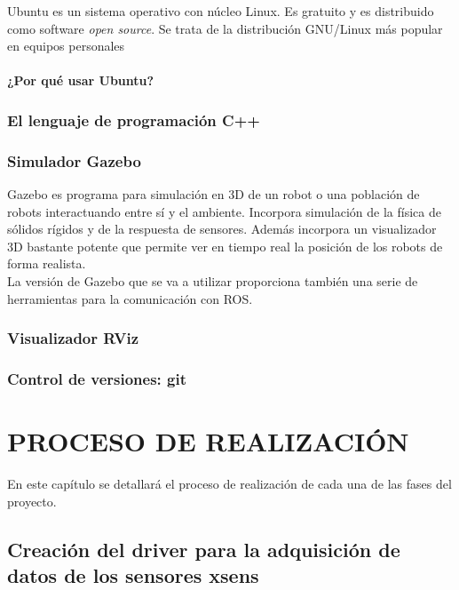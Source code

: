 \documentclass[10pt, a4paper]{report}
\begin{document}
Ubuntu es un sistema operativo con núcleo Linux. Es gratuito y es distribuido como software \textit{open source}. Se trata de la distribución GNU/Linux más popular en equipos personales

\subsubsection{¿Por qué usar Ubuntu?}

\subsection{El lenguaje de programación C++}



\subsection{Simulador Gazebo}

Gazebo es programa para simulación en 3D de un robot o una población de robots interactuando entre sí y el ambiente. Incorpora simulación de la física de sólidos rígidos y de la respuesta de sensores. Además incorpora un visualizador 3D bastante potente que permite ver en tiempo real la posición de los robots de forma realista.\\

La versión de Gazebo que se va a utilizar proporciona también una serie de herramientas para la comunicación con ROS. 
 

\subsection{Visualizador RViz}

\subsection{Control de versiones: git}


\chapter{PROCESO DE REALIZACIÓN}

En este capítulo se detallará el proceso de realización de cada una de las fases del proyecto.

\section{Creación del driver para la adquisición de datos de los sensores xsens}
\end{document}
